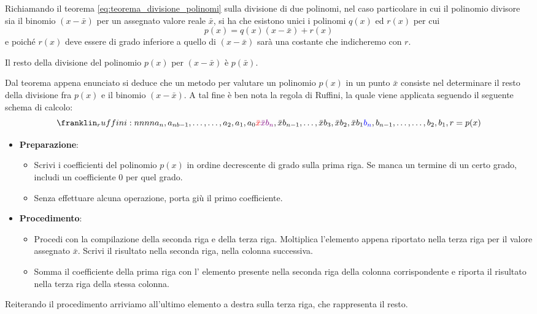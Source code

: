 \documentclass{article}
\begin{document}
Richiamando il teorema \ref{eq:teorema_divisione_polinomi} sulla divisione di
due polinomi, nel caso particolare in cui il polinomio divisore sia il
binomio $(x-\bar{x})$ per un assegnato valore reale $\bar{x}$, si ha che
esistono unici i polinomi $q(x)$ ed $r(x)$ per cui 
$$p(x)=q(x)(x-\bar{x})+r(x)$$
e poiché $r(x)$ deve essere di grado inferiore a quello di $(x-\bar{x})$ sarà
una costante che indicheremo con $r$.
\begin{theorem}
    Il resto della divisione del polinomio $p(x)$ per $(x-\bar{x})$ è $p(\bar{x})$.
\end{theorem}
Dal teorema appena enunciato si deduce che un metodo per valutare un polinomio
$p(x)$ in un punto $\bar{x}$ consiste nel determinare il resto della divisione
fra $p(x)$ e il binomio $(x-\bar{x})$. A tal fine è ben nota la regola di
Ruffini, la quale viene applicata seguendo il seguente schema di calcolo:
$$\ruffini{a_n,a_{nb-1},\ldots,\ldots,a_2,a_1,a_0}{\color{red}\bar{x}}{{\color{violet}\bar{x}b_n},\bar{x}b_{n-1},\ldots,\bar{x}b_3,\bar{x}b_2,\bar{x}b_1}{{\color{blue}b_n},
b_{n-1},\ldots,\ldots,b_2,b_1,r=p(x)}$$
\begin{itemize}
    \item \textbf{Preparazione}:
    \begin{itemize}
        \item Scrivi i coefficienti del polinomio $p(x)$ in ordine decrescente di
            grado sulla prima riga. Se manca un termine di un certo grado,
            includi un coefficiente 0 per quel grado.
        \item Senza effettuare alcuna operazione, porta giù il primo coefficiente.
    \end{itemize}
    \item \textbf{Procedimento}:
    \begin{itemize}
        \item Procedi con la compilazione della seconda riga e della terza riga.
            Moltiplica {\color{blue} l'elemento} appena riportato nella terza riga per il
            {\color{red} valore assegnato $\bar{x}$}. Scrivi il {\color{violet}risultato} 
            nella seconda riga, nella colonna successiva. 
        \item Somma il coefficiente della prima riga con l'
            {\color{violet}elemento} presente nella seconda riga della colonna
            corrispondente e riporta il risultato nella terza riga della stessa
            colonna.
    \end{itemize}
\end{itemize}
Reiterando il procedimento arriviamo all'ultimo elemento a destra sulla terza riga, 
che rappresenta il resto.
\end{document}

